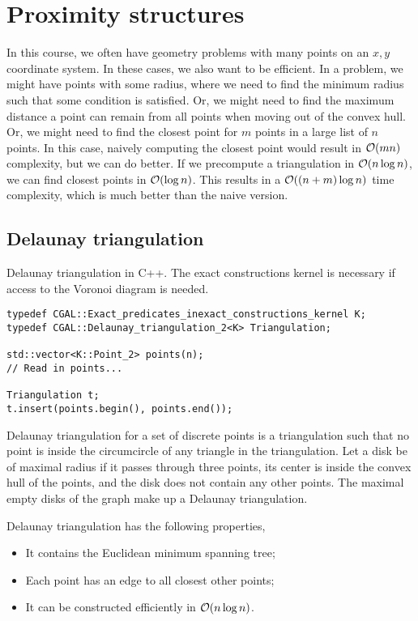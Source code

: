 \documentclass[justified,nobib]{tufte-handout}
\begin{document}
\section{Proximity structures}

In this course, we often have geometry problems with many points on an $x,y$ coordinate system. In
these cases, we also want to be efficient. In a problem, we might have points with some radius,
where we need to find the minimum radius such that some condition is satisfied. Or, we might need
to find the maximum distance a point can remain from all points when moving out of the convex hull.
Or, we might need to find the closest point for $m$ points in a large list of $n$ points. In this
case, naively computing the closest point would result in $\bigo{mn}$ complexity, but we can do
better. If we precompute a triangulation in $\bigo{n \log n}$, we can find closest points in
$\bigo{\log n}$. This results in a $\bigo{(n+m) \log n}$ time complexity, which is much better than
the naive version.

\subsection{Delaunay triangulation}

\begin{listing}
    \caption{Delaunay triangulation in C++. The exact constructions kernel is
        necessary if access to the Voronoi diagram is needed.}
    \label{lst:dt}

    \begin{lstlisting}
typedef CGAL::Exact_predicates_inexact_constructions_kernel K;
typedef CGAL::Delaunay_triangulation_2<K> Triangulation;

std::vector<K::Point_2> points(n);
// Read in points...

Triangulation t;
t.insert(points.begin(), points.end());
  \end{lstlisting}
\end{listing}

Delaunay triangulation for a set of discrete points is a triangulation such that no point is inside
the circumcircle of any triangle in the triangulation. Let a disk be of maximal radius if it passes
through three points, its center is inside the convex hull of the points, and the disk does not
contain any other points. The maximal empty disks of the graph make up a Delaunay triangulation.

Delaunay triangulation has the following properties,
\begin{itemize}
    \item It contains the Euclidean minimum spanning tree;
    \item Each point has an edge to all closest other points;
    \item It can be constructed efficiently in $\bigo{n \log n}$.
\end{itemize}
\end{document}
